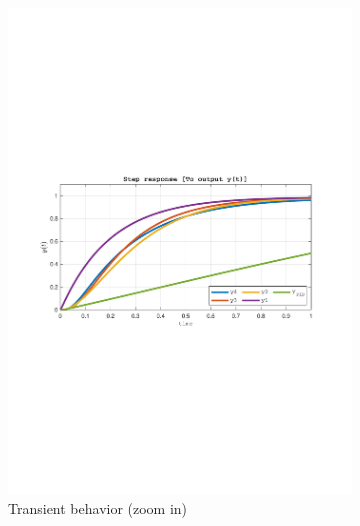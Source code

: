 \documentclass[a4paper, 12pt]{article}
\begin{document}
\begin{figure}[h!]
\begin{subfigure}[t]{0.45\textwidth}
           \includegraphics[width=\textwidth]
           {Figures/fig04b.pdf}
           \caption{Transient behavior (zoom in)}
           \label{fig:fig04b}
       \end{subfigure}
       \begin{subfigure}[t]{0.5\textwidth}

\end{subfigure}
\end{figure}
\end{document}
